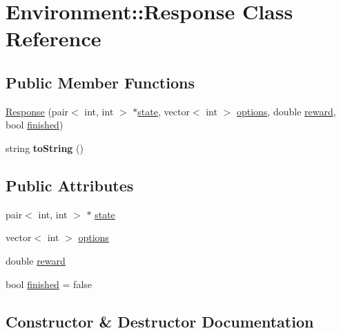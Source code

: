 \hypertarget{class_environment_1_1_response}{}\section{Environment\+:\+:Response Class Reference}
\label{class_environment_1_1_response}
\subsection*{Public Member Functions}
\begin{DoxyCompactItemize}
\item 
\mbox{\hyperlink{class_environment_1_1_response_a99c21b13f5806fd46bb656b52eddd6a5}{Response}} (pair$<$ int, int $>$ $\ast$\mbox{\hyperlink{class_environment_1_1_response_ab20f0a5064e6c7bec33600efce584489}{state}}, vector$<$ int $>$ \mbox{\hyperlink{class_environment_1_1_response_a201983545c18d0898382b7f073528ace}{options}}, double \mbox{\hyperlink{class_environment_1_1_response_a38f0083f3e1de4a30c2379de47625943}{reward}}, bool \mbox{\hyperlink{class_environment_1_1_response_a8becce546198aaec1e782cd38fbe1934}{finished}})
\item 
\mbox{\label{class_environment_1_1_response_a7c8416b8a5ff7a7a4115f36effc31ab5}} 
string {\bfseries to\+String} ()
\end{DoxyCompactItemize}
\subsection*{Public Attributes}
\begin{DoxyCompactItemize}
\item 
pair$<$ int, int $>$ $\ast$ \mbox{\hyperlink{class_environment_1_1_response_ab20f0a5064e6c7bec33600efce584489}{state}}
\item 
vector$<$ int $>$ \mbox{\hyperlink{class_environment_1_1_response_a201983545c18d0898382b7f073528ace}{options}}
\item 
double \mbox{\hyperlink{class_environment_1_1_response_a38f0083f3e1de4a30c2379de47625943}{reward}}
\item 
bool \mbox{\hyperlink{class_environment_1_1_response_a8becce546198aaec1e782cd38fbe1934}{finished}} = false
\end{DoxyCompactItemize}


\subsection{Constructor \& Destructor Documentation}
\mbox{\label{class_environment_1_1_response_a99c21b13f5806fd46bb656b52eddd6a5}} 
